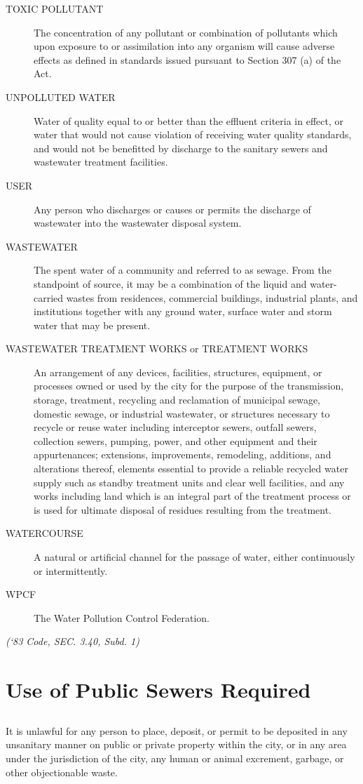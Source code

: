 \documentclass[code.tex]{subfiles}
\begin{document}
\begin{description}
\item[TOXIC POLLUTANT] The concentration of any pollutant or combination of pollutants which upon exposure to or assimilation into any organism will cause adverse effects as defined in standards issued pursuant to Section 307 (a) of the Act.
\item[UNPOLLUTED WATER] Water of quality equal to or better than the effluent criteria in effect, or water that would not cause violation of receiving water quality standards, and would not be benefitted by discharge to the sanitary sewers and wastewater treatment facilities.
\item[USER] Any person who discharges or causes or permits the discharge of wastewater into the wastewater disposal system.
\item[WASTEWATER] The spent water of a community and referred to as sewage.  From the standpoint of source, it may be a combination of the liquid and water-carried wastes from residences, commercial buildings, industrial plants, and institutions together with any ground water, surface water and storm water that may be present.
\item[WASTEWATER TREATMENT WORKS or TREATMENT WORKS] An arrangement of any devices, facilities, structures, equipment, or processes owned or used by the city for the purpose of the transmission, storage, treatment, recycling and reclamation of municipal sewage, domestic sewage, or industrial wastewater, or structures necessary to recycle or reuse water including interceptor sewers, outfall sewers, collection sewers, pumping, power, and other equipment and their appurtenances; extensions, improvements, remodeling, additions, and alterations thereof, elements essential to provide a reliable recycled water supply such as standby treatment units and clear well facilities, and any works including land which is an integral part of the treatment process or is used for ultimate disposal of residues resulting from the treatment.
\item[WATERCOURSE] A natural or artificial channel for the passage of water, either continuously or intermittently.
\item[WPCF] The Water Pollution Control Federation.
\end{description}
\emph{(‘83 Code, SEC. 3.40, Subd. 1)}
\section{Use of Public Sewers Required}
\subsection{}
It is unlawful for any person to place, deposit, or permit to be deposited in any unsanitary manner on public or private property within the city, or in any area under the jurisdiction of the city, any human or animal excrement, garbage, or other objectionable waste.
\end{document}
